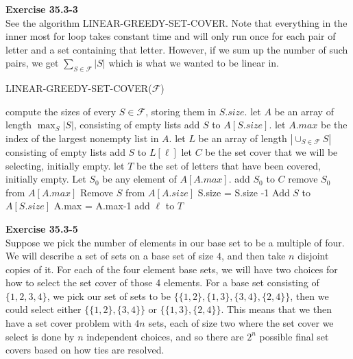 \documentclass{article}
\begin{document}
\noindent\textbf{Exercise 35.3-3}\\

See the algorithm LINEAR-GREEDY-SET-COVER. Note that everything in the inner most for loop takes constant time and will only run once for each pair of letter and a set containing that letter. However, if we sum up the number of such pairs, we get $\sum_{S\in\mathcal{F}} |S|$ which is what we wanted to be linear in.

\begin{algorithm}
\caption{LINEAR-GREEDY-SET-COVER($\mathcal{F}$)}
\begin{algorithmic}
\State compute the sizes of every $S\in \mathcal{F}$, storing them in $S.size$.
\State let $A$ be an array of length $\max_S |S|$, consisting of empty lists
\State add $S$ to $A[S.size]$.
\EndFor
\State let $A.max$ be the index of the largest nonempty list in $A$.
\State let $L$ be an array of length $|\cup_{S\in\mathcal{F}} S|$ consisting of empty lists
\State add $S$ to $L[\ell]$
\EndFor
\EndFor
\State let $C$ be the set cover that we will be selecting, initially empty.
\State let $T$ be the set of letters that have been covered, initially empty.
\State Let $S_0$ be any element of $A[A.max]$.
\State add $S_0$ to $C$
\State remove $S_0$ from $A[A.max]$
\State Remove $S$ from $A[A.size]$
\State S.size = S.size -1
\State Add $S$ to $A[S.size]$
\State A.max = A.max-1
\EndIf
\EndFor
\State add $\ell$ to $T$
\EndFor
\EndWhile
\end{algorithmic}
\end{algorithm}



\noindent\textbf{Exercise 35.3-5}\\

Suppose we pick the number of elements in our base set to be a multiple of four. We will describe a set of sets on a base set of size $4$, and then take $n$ disjoint copies of it. For each of the four element base sets, we will have two choices for how to select the set cover of those 4 elements. For a base set consisting of $\{1,2,3,4\}$, we pick our set of sets to be $\{ \{1,2\},\{1,3\},\{3,4\},\{2,4\}\}$, then we could select either $\{\{1,2\},\{3,4\}\}$ or $\{\{1,3\},\{2,4\}\}$. This means that we then have a set cover problem with $4n$ sets, each of size two where the set cover we select is done by $n$ independent choices, and so there are $2^n$ possible final set covers based on how ties are resolved.\\
\end{document}
